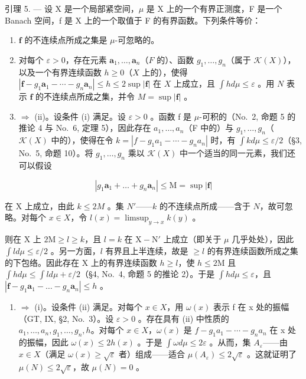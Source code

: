 引理 5. --- 设 X 是一个局部紧空间，\(\mu\) 是 X 上的一个有界正测度，F 是一个 Banach 空间，f 是 X 上的一个取值于 F 的有界函数。下列条件等价：

\begin{enumerate}
\def\labelenumi{(\roman{enumi})}
\item
  \(\mathbf{f}\) 的不连续点所成之集是 \(\mu\)-可忽略的。
\item
  对每个 \(\varepsilon > 0\)，存在元素 \(\mathbf{a}_1, \ldots, \mathbf{a}_n\)（\(F\) 的）、函数 \(g_1, \ldots, g_n\)（属于 \(\mathcal{K}(X)\)），以及一个有界连续函数 \(h \geqslant 0\)（\(X\) 上的），使得 \(|\mathbf{f} - g_1 \mathbf{a}_1 - \cdots - g_n \mathbf{a}_n| \leqslant h \leqslant 2 \sup |\mathbf{f}|\) 在 \(X\) 上成立，且 \(\int h d\mu \leqslant \varepsilon\) 。用 \(N\) 表示 \(\mathbf{f}\) 的不连续点所成之集，并令 \(M = \sup |\mathbf{f}|\) 。
\setcounter{enumi}{0}
\item
  \(\Rightarrow\) (ii)。设条件 (i) 满足。设 \(\varepsilon > 0\) 。函数 f 是 \(\mu\)-可积的（No.~2, 命题 5 的推论 4 与 No.~6, 定理 5），因此存在 \(a_{1}, \ldots, a_{n}\)（F 中的）与 \(g_{1}, \ldots, g_{n}\)（\(\mathcal{K}(X)\) 中的），使得在令 \(k = |f - g_{1}a_{1} - \cdots - g_{n}a_{n}|\) 时，有 \(\int k d\mu \leqslant \varepsilon/2\)（§3, No.~5,
命题 10）。将 \(g_1, \ldots, g_n\) 乘以 \(\mathcal{K}(X)\) 中一个适当的同一元素，我们还可以假设
\end{enumerate}

\[
\left| g _ {1} \mathbf {a} _ {1} + \dots + g _ {n} \mathbf {a} _ {n} \right| \leqslant \mathrm{M} = \sup | \mathbf {f} |
\]

在 X 上成立，由此 \(k \leqslant 2M\) 。集 \(N'\)——\(k\) 的不连续点所成——含于 \(N\)，故可忽略。对每个 \(x \in X\)，令 \(l(x) = \limsup_{y \to x} k(y)\) 。

则在 X 上 \(2\mathrm{M} \geqslant l \geqslant k\)，且 \(l = k\) 在 \(\mathrm{X} - \mathrm{N}'\) 上成立（即关于 \(\mu\) 几乎处处），因此 \(\int l d\mu \leqslant \varepsilon / 2\) 。另一方面，\(l\) 有界且上半连续，故是 \(\geqslant l\) 的有界连续函数所成之集的下包络。因此存在 X 上的有界连续函数 \(h \geqslant l\)，使 \(h \leqslant 2\mathrm{M}\) 且 \(\int h d\mu \leqslant \int l d\mu + \varepsilon / 2\)（§4, No.~4, 命题 5 的推论 2）。于是 \(\int h d\mu \leqslant \varepsilon\)，且 \(|\mathbf{f} - g_1\mathbf{a}_1 - \dots - g_n\mathbf{a}_n| \leqslant h\) 。

\begin{enumerate}
\def\labelenumi{(\roman{enumi})}
\setcounter{enumi}{1}
\tightlist
\item
  \(\Rightarrow\) (i)。设条件 (ii) 满足。对每个 \(x \in X\)，用 \(\omega(x)\) 表示 f 在 x 处的振幅（GT, IX, §2, No.~3）。设 \(\varepsilon > 0\) 。存在具有 (ii) 中性质的 \(a_{1}, \ldots, a_{n}, g_{1}, \ldots, g_{n}, h\)。对每个 \(x \in X\)，\(\omega(x)\) 是 \(f - g_{1}a_{1} - \cdots - g_{n}a_{n}\) 在 x 处的振幅，因此 \(\omega(x) \leqslant 2h(x)\) 。于是 \(\int \omega d\mu \leqslant 2\varepsilon\) 。从而，集 \(A_{\varepsilon}\)——由 \(x \in X\)（满足 \(\omega(x) \geqslant \sqrt{\varepsilon}\) 者）组成——适合 \(\mu(A_{\varepsilon}) \leqslant 2\sqrt{\varepsilon}\) 。这就证明了 \(\mu(N) \leqslant 2\sqrt{\varepsilon}\)，故 \(\mu(N) = 0\) 。
\end{enumerate}

